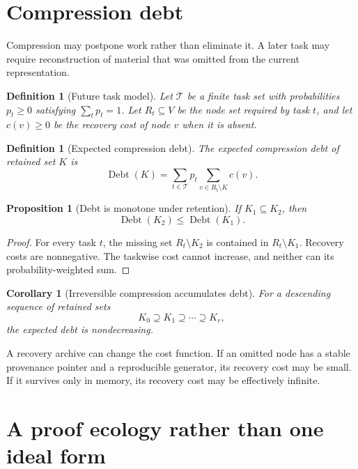 \documentclass[11pt,oneside]{article}
\theoremstyle{komorebiplain}
\newtheorem{proposition}[theorem]{Proposition}
\newtheorem{corollary}[theorem]{Corollary}
\theoremstyle{komorebidefinition}
\newtheorem{definition}[theorem]{Definition}
\theoremstyle{komorebiremark}
\newcommand{\Tcal}{\mathcal T}
\newcommand{\Debt}{\operatorname{Debt}}
\begin{document}
\section{Compression debt}
\label{sec:old10}

Compression may postpone work rather than eliminate it. A later task may require reconstruction of material that was omitted from the current representation.

\begin{definition}[Future task model]
\label{res:10:1}
Let $\Tcal$ be a finite task set with probabilities $p_t\ge0$ satisfying $\sum_t p_t=1$. Let $R_t\subseteq V$ be the node set required by task $t$, and let $c(v)\ge0$ be the recovery cost of node $v$ when it is absent.
\end{definition}

\begin{definition}[Expected compression debt]
\label{res:10:2}
The expected compression debt of retained set $K$ is
\[
\Debt(K)
=
\sum_{t\in\Tcal}p_t
\sum_{v\in R_t\setminus K}c(v).
\]
\end{definition}

\begin{proposition}[Debt is monotone under retention]
\label{res:10:3}
If $K_1\subseteq K_2$, then
\[
\Debt(K_2)\le\Debt(K_1).
\]
\end{proposition}

\begin{proof}
For every task $t$, the missing set $R_t\setminus K_2$ is contained in $R_t\setminus K_1$. Recovery costs are nonnegative. The taskwise cost cannot increase, and neither can its probability-weighted sum.
\end{proof}

\begin{corollary}[Irreversible compression accumulates debt]
\label{res:10:4}
For a descending sequence of retained sets
\[
K_0\supseteq K_1\supseteq\cdots\supseteq K_r,
\]
the expected debt is nondecreasing.
\end{corollary}

A recovery archive can change the cost function. If an omitted node has a stable provenance pointer and a reproducible generator, its recovery cost may be small. If it survives only in memory, its recovery cost may be effectively infinite.


\section{A proof ecology rather than one ideal form}
\label{sec:old11}
\end{document}
